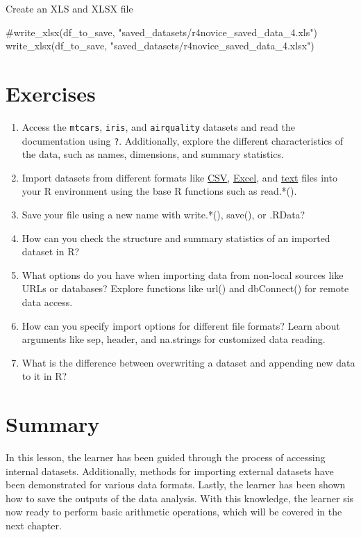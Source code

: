 \documentclass[
  letterpaper,
  DIV=11,
  numbers=noendperiod]{scrreprt}
\newenvironment{Shaded}{}{}
\newcommand{\CommentTok}[1]{\textcolor[rgb]{0.42,0.45,0.49}{#1}}
\newcommand{\FunctionTok}[1]{\textcolor[rgb]{0.44,0.26,0.76}{#1}}
\newcommand{\NormalTok}[1]{\textcolor[rgb]{0.14,0.16,0.18}{#1}}
\newcommand{\StringTok}[1]{\textcolor[rgb]{0.01,0.18,0.38}{#1}}
\begin{document}
Create an XLS and XLSX file

\begin{Shaded}
\begin{Highlighting}[]
\CommentTok{\#write\_xlsx(df\_to\_save, "saved\_datasets/r4novice\_saved\_data\_4.xls")}
\FunctionTok{write\_xlsx}\NormalTok{(df\_to\_save, }\StringTok{"saved\_datasets/r4novice\_saved\_data\_4.xlsx"}\NormalTok{)}
\end{Highlighting}
\end{Shaded}

\section{Exercises}\label{exercises-4}

\begin{enumerate}
\def\labelenumi{\roman{enumi}.}
\item
  Access the \texttt{mtcars}, \texttt{iris}, and \texttt{airquality}
  datasets and read the documentation using \texttt{?}. Additionally,
  explore the different characteristics of the data, such as names,
  dimensions, and summary statistics.
\item
  Import datasets from different formats like \href{}{CSV},
  \href{}{Excel}, and \href{}{text} files into your R environment using
  the base R functions such as read.*().
\item
  Save your file using a new name with write.*(), save(), or .RData?
\item
  How can you check the structure and summary statistics of an imported
  dataset in R?
\item
  What options do you have when importing data from non-local sources
  like URLs or databases? Explore functions like url() and dbConnect()
  for remote data access.
\item
  How can you specify import options for different file formats? Learn
  about arguments like sep, header, and na.strings for customized data
  reading.
\item
  What is the difference between overwriting a dataset and appending new
  data to it in R?
\end{enumerate}

\section{Summary}\label{summary-4}

In this lesson, the learner has been guided through the process of
accessing internal datasets. Additionally, methods for importing
external datasets have been demonstrated for various data formats.
Lastly, the learner has been shown how to save the outputs of the data
analysis. With this knowledge, the learner sis now ready to perform
basic arithmetic operations, which will be covered in the next chapter.
\end{document}
